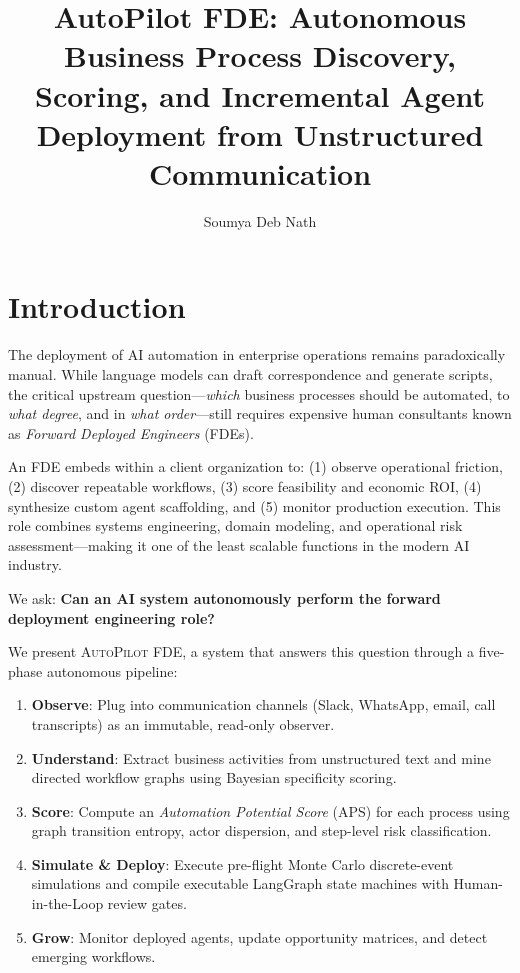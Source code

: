\documentclass[sigconf,natbib=true]{acmart}
\title{AutoPilot FDE: Autonomous Business Process Discovery, Scoring, and Incremental Agent Deployment from Unstructured Communication}
\author{Soumya Deb Nath}
\affiliation{
  \institution{OTAi Tech}
  \city{India}
}
\begin{document}
\maketitle

\section{Introduction}
\label{sec:intro}

The deployment of AI automation in enterprise operations remains paradoxically manual. While language models can draft correspondence and generate scripts, the critical upstream question---\emph{which} business processes should be automated, to \emph{what degree}, and in \emph{what order}---still requires expensive human consultants known as \emph{Forward Deployed Engineers} (FDEs).

An FDE embeds within a client organization to: (1) observe operational friction, (2) discover repeatable workflows, (3) score feasibility and economic ROI, (4) synthesize custom agent scaffolding, and (5) monitor production execution. This role combines systems engineering, domain modeling, and operational risk assessment---making it one of the least scalable functions in the modern AI industry.

We ask: \textbf{Can an AI system autonomously perform the forward deployment engineering role?}

We present \textsc{AutoPilot FDE}, a system that answers this question through a five-phase autonomous pipeline:

\begin{enumerate}
    \item \textbf{Observe}: Plug into communication channels (Slack, WhatsApp, email, call transcripts) as an immutable, read-only observer.
    \item \textbf{Understand}: Extract business activities from unstructured text and mine directed workflow graphs using Bayesian specificity scoring.
    \item \textbf{Score}: Compute an \emph{Automation Potential Score} (APS) for each process using graph transition entropy, actor dispersion, and step-level risk classification.
    \item \textbf{Simulate \& Deploy}: Execute pre-flight Monte Carlo discrete-event simulations and compile executable LangGraph state machines with Human-in-the-Loop review gates.
    \item \textbf{Grow}: Monitor deployed agents, update opportunity matrices, and detect emerging workflows.
\end{enumerate}
\end{document}

